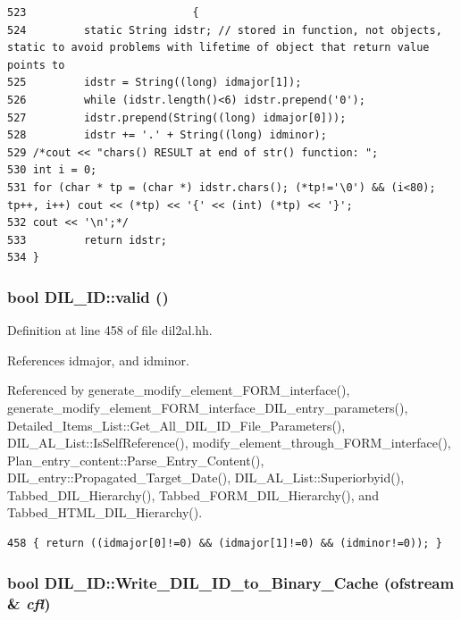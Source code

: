\footnotesize\begin{verbatim}523                          {
524         static String idstr; // stored in function, not objects, static to avoid problems with lifetime of object that return value points to
525         idstr = String((long) idmajor[1]);
526         while (idstr.length()<6) idstr.prepend('0');
527         idstr.prepend(String((long) idmajor[0]));
528         idstr += '.' + String((long) idminor);
529 /*cout << "chars() RESULT at end of str() function: ";
530 int i = 0;
531 for (char * tp = (char *) idstr.chars(); (*tp!='\0') && (i<80); tp++, i++) cout << (*tp) << '{' << (int) (*tp) << '}';
532 cout << '\n';*/
533         return idstr;
534 }
\end{verbatim}\normalsize 
{}
\subsubsection{\setlength{\rightskip}{0pt plus 5cm}bool DIL\_\-ID::valid ()\hspace{0.3cm}{\tt  [inline]}}\label{classDIL__ID_a17}




Definition at line 458 of file dil2al.hh.

References idmajor, and idminor.

Referenced by generate\_\-modify\_\-element\_\-FORM\_\-interface(), generate\_\-modify\_\-element\_\-FORM\_\-interface\_\-DIL\_\-entry\_\-parameters(), Detailed\_\-Items\_\-List::Get\_\-All\_\-DIL\_\-ID\_\-File\_\-Parameters(), DIL\_\-AL\_\-List::Is\-Self\-Reference(), modify\_\-element\_\-through\_\-FORM\_\-interface(), Plan\_\-entry\_\-content::Parse\_\-Entry\_\-Content(), DIL\_\-entry::Propagated\_\-Target\_\-Date(), DIL\_\-AL\_\-List::Superiorbyid(), Tabbed\_\-DIL\_\-Hierarchy(), Tabbed\_\-FORM\_\-DIL\_\-Hierarchy(), and Tabbed\_\-HTML\_\-DIL\_\-Hierarchy().



\footnotesize\begin{verbatim}458 { return ((idmajor[0]!=0) && (idmajor[1]!=0) && (idminor!=0)); }
\end{verbatim}\normalsize 
{}
\subsubsection{\setlength{\rightskip}{0pt plus 5cm}bool DIL\_\-ID::Write\_\-DIL\_\-ID\_\-to\_\-Binary\_\-Cache (ofstream \& {\em cfl})}\label{classDIL__ID_a18}




